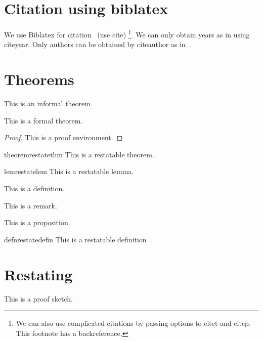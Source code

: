 \documentclass[11.5pt]{article}
\begin{document}
\section{Citation using biblatex}
We use Biblatex for citation~\cite{abbas2020quantum,angluin1988queries} (use cite)
\footnote{
We can also use complicated citations \cite[see][Section 2.1]{shalev2012using} by passing options to citet and citep. This footnote has a backreference.
}. We can only obtain years as in \citeyear{abbas2020quantum} using citeyear. Only authors can be obtained by citeauthor as in~\citeauthor{abbas2020quantum}.
\clearpage
\section{Theorems}
\begin{theorem*}
This is an informal theorem.
\end{theorem*}
\begin{theorem}\label{thm:formal}
This is a formal theorem.
\end{theorem}
\begin{proof}
This is a proof environment.
\end{proof}

\begin{restatable}{theorem}{restatethm}\label{thm2}
This is a restatable theorem.
\end{restatable}
\begin{restatable}{lem}{restatelem}
This is a restatable lemma.
\end{restatable}

\begin{defn}[Definition 1]
This is a definition.
\end{defn}
\begin{remark}[Remark 1]
This is a remark.
\end{remark}
\begin{proposition}[Proposition]
This is a proposition.
\end{proposition}
\begin{restatable}[Definition 2]{defn}{restatedefin}
    This is a restatable definition
\end{restatable}

\section{Restating}
\restatethm*
\begin{psketch}
    This is a proof sketch.
\end{psketch}
\end{document}
